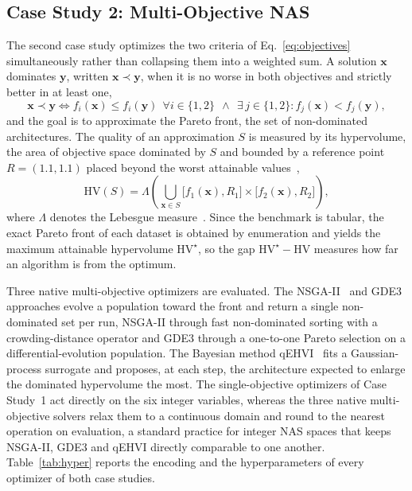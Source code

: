 \documentclass[runningheads]{llncs}
\begin{document}
\subsection{Case Study 2: Multi-Objective NAS} \label{SEC3.3}
The second case study optimizes the two criteria of Eq.~\eqref{eq:objectives} simultaneously rather than collapsing them into a weighted sum. A solution $\mathbf{x}$ dominates $\mathbf{y}$, written $\mathbf{x} \prec \mathbf{y}$, when it is no worse in both objectives and strictly better in at least one,
\begin{equation}
\mathbf{x} \prec \mathbf{y} \iff f_i(\mathbf{x}) \le f_i(\mathbf{y})\ \ \forall i \in \{1,2\} \ \ \wedge\ \ \exists\, j \in \{1,2\}: f_j(\mathbf{x}) < f_j(\mathbf{y}),
\label{eq:dominance}
\end{equation}
and the goal is to approximate the Pareto front, the set of non-dominated architectures. The quality of an approximation $S$ is measured by its hypervolume, the area of objective space dominated by $S$ and bounded by a reference point $R = (1.1, 1.1)$ placed beyond the worst attainable values~\cite{zitzler1999hv},
\begin{equation}
\mathrm{HV}(S) = \Lambda\!\left( \bigcup_{\bm{x}\in S} \big[f_1(\bm{x}), R_1\big] \times \big[f_2(\bm{x}), R_2\big] \right),
\label{eq:hv}
\end{equation}
where $\Lambda$ denotes the Lebesgue measure~\cite{folland1999real}. Since the benchmark is tabular, the exact Pareto front of each dataset is obtained by enumeration and yields the maximum attainable hypervolume $\mathrm{HV}^{\star}$, so the gap $\mathrm{HV}^{\star}-\mathrm{HV}$ measures how far an algorithm is from the optimum.

Three native multi-objective optimizers are evaluated. The NSGA-II~\cite{deb2002nsga2} and GDE3~\cite{kukkonen2005gde3} approaches evolve a population toward the front and return a single non-dominated set per run, NSGA-II through fast non-dominated sorting with a crowding-distance operator and GDE3 through a one-to-one Pareto selection on a differential-evolution population. The Bayesian method qEHVI~\cite{daulton2020qehvi} fits a Gaussian-process surrogate and proposes, at each step, the architecture expected to enlarge the dominated hypervolume the most. The single-objective optimizers of Case Study~1 act directly on the six integer variables, whereas the three native multi-objective solvers relax them to a continuous domain and round to the nearest operation on evaluation, a standard practice for integer NAS spaces that keeps NSGA-II, GDE3 and qEHVI directly comparable to one another. Table~\ref{tab:hyper} reports the encoding and the hyperparameters of every optimizer of both case studies.
\end{document}
